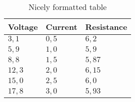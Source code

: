 \documentclass[a4paper, 12pt]{article}
\begin{document}
\begin{table}[H]
	\centering
	\begin{tabular}{lll}
		\toprule
		Voltage & Current  & Resistance\\ 
		\midrule
		\rowcolor{gray} $3,1$ & $0,5$ & $6,2$\\
		$5,9$ & $1,0$ & $5,9$\\
		\rowcolor{gray} $8,8$ & $1,5$ & $5,87$\\
		$12,3$ & $2,0$ & $6,15$\\
		\rowcolor{gray} $15,0$ & $2,5$ & $6,0$\\
		$17,8$ & $3,0$ & $5,93$\\
		\bottomrule
	\end{tabular}
	\caption{Nicely formatted table}
\end{table}
\end{document}
